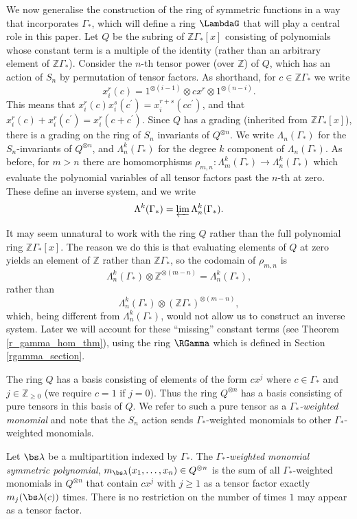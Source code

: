 We now generalise the construction of the ring of symmetric functions in a way that incorporates $\Gamma_*$, which will define a ring $\LambdaG$ that will play a central role in this paper. Let $Q$ be the subring of $\mathbb{Z}\Gamma_*[x]$ consisting of polynomials whose constant term is a multiple of the identity (rather than an arbitrary element of $\mathbb{Z}\Gamma_*$). Consider the $n$-th tensor power (over $\mathbb{Z}$) of $Q$, which has an action of $S_n$ by permutation of tensor factors. As shorthand, for $c \in \mathbb{Z}\Gamma_*$ we write 
\[
x_i^r(c) = 1^{\otimes (i-1)} \otimes cx^r \otimes 1^{\otimes (n-i)}.
\]
This means that $x_i^r(c) x_i^s(c^\prime) = x_i^{r+s}(cc^\prime)$, and that $x_i^r(c) + x_i^r(c^\prime) = x_i^r(c+c^\prime)$. Since $Q$ has a grading (inherited from $\mathbb{Z}\Gamma_*[x]$), there is a grading on the ring of $S_n$ invariants of $Q^{\otimes n}$. We write $\Lambda_n(\Gamma_*)$ for the $S_n$-invariants of $Q^{\otimes n}$, and $\Lambda_n^k(\Gamma_*)$ for the degree $k$ component of $\Lambda_n(\Gamma_*)$. As before, for $m>n$ there are homomorphisms $\rho_{m,n}: \Lambda_{m}^k(\Gamma_*) \to \Lambda_{n}^k(\Gamma_*)$ which evaluate the polynomial variables of all tensor factors past the $n$-th at zero. These define an inverse system, and we write
\[
\Lambda^k(\Gamma_*) = \varprojlim \Lambda_n^k(\Gamma_*).
\]
\begin{remark}
It may seem unnatural to work with the ring $Q$ rather than the full polynomial ring $\mathbb{Z}\Gamma_*[x]$. The reason we do this is that evaluating elements of $Q$ at zero yields an element of $\mathbb{Z}$ rather than $\mathbb{Z}\Gamma_*$, so the codomain of $\rho_{m,n}$ is
\[
\Lambda_n^k(\Gamma_*) \otimes \mathbb{Z}^{\otimes (m-n)} = \Lambda_n^k(\Gamma_*),
\]
rather than
\[
\Lambda_n^k(\Gamma_*) \otimes (\mathbb{Z}\Gamma_*)^{\otimes (m-n)},
\]
which, being different from $\Lambda_n^k(\Gamma_*)$, would not allow us to construct an inverse system. Later we will account for these ``missing'' constant terms (see Theorem \ref{r_gamma_hom_thm}), using the ring $\RGamma$ which is defined in Section \ref{rgamma_section}.
\end{remark}

The ring $Q$ has a basis consisting of elements of the form $c x^j$ where $c \in \Gamma_*$ and $j \in \mathbb{Z}_{\geq 0}$ (we require $c = 1$ if $j=0$). Thus the ring $Q^{\otimes n}$ has a basis consisting of pure tensors in this basis of $Q$. We refer to such a pure tensor as a \emph{$\Gamma_*$-weighted monomial} and note that the $S_n$ action sends $\Gamma_*$-weighted monomials to other $\Gamma_*$-weighted monomials.
\begin{definition}
Let $\bs \lambda$ be a multipartition indexed by $\Gamma_*$. The \emph{$\Gamma_*$-weighted monomial symmetric polynomial}, $m_{\bs \lambda}(x_1, \ldots, x_n) \in Q^{\otimes n}$ is the sum of all $\Gamma_*$-weighted monomials in $Q^{\otimes n}$ that contain $c x^j$ with $j \geq 1$ as a tensor factor exactly $m_j(\bs \lambda(c))$ times. There is no restriction on the number of times $1$ may appear as a tensor factor.
\end{definition}

